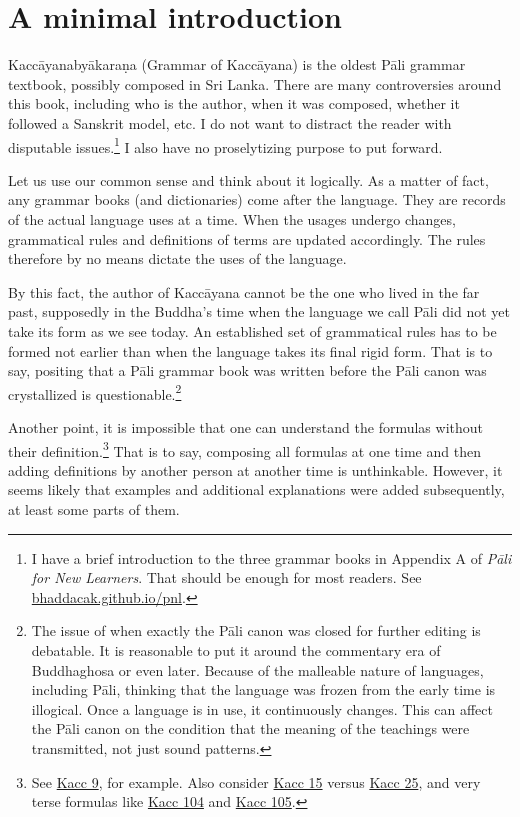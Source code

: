 \cleardoublepage
{}
{}
\chapter*{A minimal introduction}

Kaccāyanabyākaraṇa (Grammar of Kaccāyana) is the oldest Pāli grammar textbook, possibly composed in Sri Lanka. There are many controversies around this book, including who is the author, when it was composed, whether it followed a Sanskrit model, etc. I do not want to distract the reader with disputable issues.\footnote{I have a brief introduction to the three grammar books in Appendix A of \emph{Pāli for New Learners}. That should be enough for most readers. See \url{bhaddacak.github.io/pnl}.} I also have no proselytizing purpose to put forward.

Let us use our common sense and think about it logically. As a matter of fact, any grammar books (and dictionaries) come after the language. They are records of the actual language uses at a time. When the usages undergo changes, grammatical rules and definitions of terms are updated accordingly. The rules therefore by no means dictate the uses of the language.

By this fact, the author of Kaccāyana cannot be the one who lived in the far past, supposedly in the Buddha's time when the language we call Pāli did not yet take its form as we see today. An established set of grammatical rules has to be formed not earlier than when the language takes its final rigid form. That is to say, positing that a Pāli grammar book was written before the Pāli canon was crystallized is questionable.\footnote{The issue of when exactly the Pāli canon was closed for further editing is debatable. It is reasonable to put it around the commentary era of Buddhaghosa or even later. Because of the malleable nature of languages, including Pāli, thinking that the language was frozen from the early time is illogical. Once a language is in use, it continuously changes. This can affect the Pāli canon on the condition that the meaning of the teachings were transmitted, not just sound patterns.}

Another point, it is impossible that one can understand the formulas without their definition.\footnote{See \hyperref[sut:9]{Kacc 9}, for example. Also consider \hyperref[sut:15]{Kacc 15} versus \hyperref[sut:25]{Kacc 25}, and very terse formulas like \hyperref[sut:104]{Kacc 104} and \hyperref[sut:105]{Kacc 105}.} That is to say, composing all formulas at one time and then adding definitions by another person at another time is unthinkable. However, it seems likely that examples and additional explanations were added subsequently, at least some parts of them.

